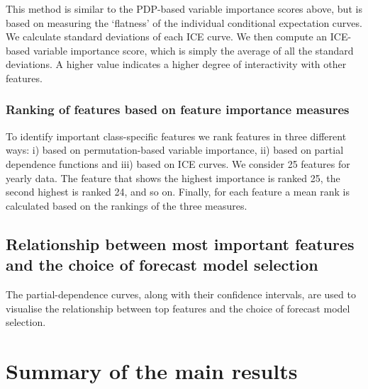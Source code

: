 \documentclass[11pt,a4paper,]{article}
\begin{document}
This method is similar to the PDP-based variable importance scores above, but is based on measuring the `flatness' of the individual conditional expectation curves. We calculate standard deviations of each ICE curve. We then compute an ICE-based variable importance score, which is simply the average of all the standard deviations. A higher value indicates a higher degree of interactivity with other features.

\hypertarget{ranking-of-features-based-on-feature-importance-measures}{%
\subsubsection{Ranking of features based on feature importance measures}\label{ranking-of-features-based-on-feature-importance-measures}}

To identify important class-specific features we rank features in three different ways: i) based on permutation-based variable importance, ii) based on partial dependence functions and iii) based on ICE curves. We consider 25 features for yearly data. The feature that shows the highest importance is ranked 25, the second highest is ranked 24, and so on. Finally, for each feature a mean rank is calculated based on the rankings of the three measures.

\hypertarget{relationship-between-most-important-features-and-the-choice-of-forecast-model-selection}{%
\subsection{Relationship between most important features and the choice of forecast model selection}\label{relationship-between-most-important-features-and-the-choice-of-forecast-model-selection}}

The partial-dependence curves, along with their confidence intervals, are used to visualise the relationship between top features and the choice of forecast model selection.

\hypertarget{results}{%
\section{Summary of the main results}\label{results}}
\end{document}
